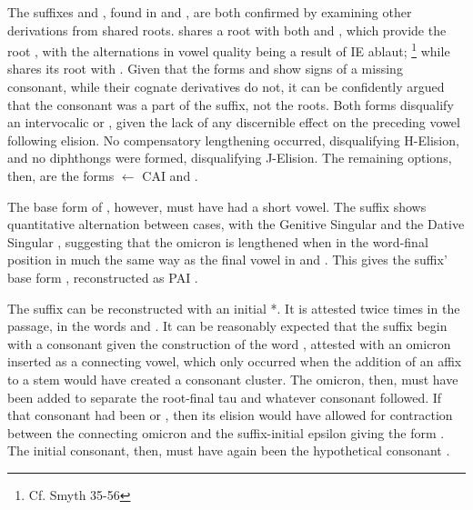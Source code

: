 The suffixes  and , found in  and ,
are both confirmed by examining other derivations from shared roots. 
shares a root with both  and , which provide
the root , with the alternations in vowel quality being a result
of IE ablaut; \footnote{Cf. Smyth 35-56} while  shares its root with
. Given that the forms  and  show signs
of a missing consonant, while their cognate derivatives do not, it can be
confidently argued that the consonant was a part of the suffix, not the roots.
Both forms disqualify an intervocalic  or , given the lack of any
discernible effect on the preceding vowel following elision.
No compensatory lengthening occurred, disqualifying H-Elision, and no
diphthongs were formed, disqualifying J-Elision. The remaining options, then,
are the forms  $\gets$ CAI  and
. 

The base form of , however, must have had a short vowel.
The suffix shows quantitative alternation between cases, with the
Genitive Singular  and the Dative Singular ,
suggesting that the omicron  is lengthened when in the
word-final position in much the same way as the final vowel in
 and . This gives the suffix' base form
, reconstructed as PAI .



The suffix  can be reconstructed with an initial *\w.
It is attested twice times in the passage, in the words  and .
It can be reasonably expected that the suffix begin with a consonant
given the construction of the word , attested with
an omicron  inserted as a connecting vowel, which only
occurred when the addition of an affix to a stem would have created a
consonant cluster. The omicron, then, must have been added to separate
the root-final tau  and whatever consonant followed.
If that consonant had been  or , then its elision would have
allowed for contraction between the connecting omicron 
and the suffix-initial epsilon  giving the form
. The initial consonant, then, must have again been the
hypothetical consonant \w.

